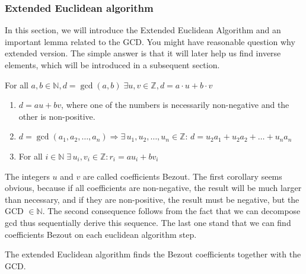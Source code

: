 \documentclass[../lecture-notes.tex]{subfiles}
\begin{document}
\subsubsection{Extended Euclidean algorithm}

In this section, we will introduce the Extended Euclidean Algorithm and an important lemma related to the GCD. You might have reasonable question why extended version. The simple answer is that it will later help us find inverse elements, which will be introduced in a subsequent section.

\begin{lemma} 
    For all $a, b \in \mathbb{N}, d = \gcd(a, b) \; \exists u, v \in \mathbb{Z}, d = a \cdot u + b \cdot v$
\end{lemma}

\begin{corollary} 
    \hfill
    \begin{enumerate}
        \item $d = au + bv$, where one of the numbers is necessarily non-negative and the other is non-positive.
        \item $d = \gcd(a_1, a_2, \dots, a_n) \Rightarrow \exists \, u_1, u_2, \dots, u_n \in \mathbb{Z}: \, d = u_2 a_1 + u_2 a_2 + \dots + u_n a_n$
        \item For all $i \in \mathbb{N} \;\exists \, u_i, v_i \in \mathbb{Z}: r_i = a u_i + b v_i$
    \end{enumerate}    
\end{corollary}

The integers $u$ and $v$ are called coefficients Bezout. The first corollary seems obvious, because if all coefficients are non-negative, the result will be much larger than necessary, and if they are non-positive, the result must be negative, but the GCD $ \in \mathbb{N} $. The second consequence follows from the fact that we can decompose gcd thus sequentially derive this sequence. The last one stand that we can find coefficients Bezout on each euclidean algorithm step.

The extended Euclidean algorithm finds the Bezout coefficients together with the GCD.
\end{document}
